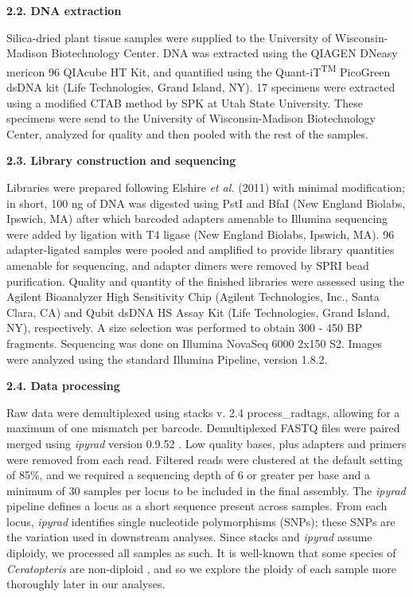 \documentclass[12pt]{article}
\begin{document}
\begin{flushleft}
\textbf{2.2. DNA extraction}

Silica-dried plant tissue samples were supplied to the University of Wisconsin-Madison Biotechnology Center. DNA was extracted using the QIAGEN DNeasy mericon 96 QIAcube HT Kit, and quantified using the Quant-iT\textsuperscript{TM} PicoGreen\textsuperscript{\textregistered} dsDNA kit (Life Technologies, Grand Island, NY). 17 specimens were extracted using a modified CTAB method \autocite{Doyle1987} by SPK at Utah State University. These specimens were send to the University of Wisconsin-Madison Biotechnology Center, analyzed for quality and then pooled with the rest of the samples.

\textbf{2.3. Library construction and sequencing}

Libraries were prepared following Elshire \textit{et al.} (2011)\nocite{Elshire2011} with minimal modification; in short, 100 ng of DNA was digested using PstI and BfaI (New England Biolabs, Ipswich, MA) after which barcoded adapters amenable to Illumina sequencing were added by ligation with T4 ligase (New England Biolabs, Ipswich, MA). 96 adapter-ligated samples were pooled and amplified to provide library quantities amenable for sequencing, and adapter dimers were removed by SPRI bead purification. Quality and quantity of the finished libraries were assessed using the Agilent Bioanalyzer High Sensitivity Chip (Agilent Technologies, Inc., Santa Clara, CA) and Qubit\textsuperscript{\textregistered} dsDNA HS Assay Kit (Life Technologies, Grand Island, NY), respectively. A size selection was performed to obtain 300 - 450 BP fragments. Sequencing was done on Illumina NovaSeq 6000 2x150 S2. Images were analyzed using the standard Illumina Pipeline, version 1.8.2. 

\textbf{2.4. Data processing}

Raw data were demultiplexed using stacks v. 2.4 \autocite{Catchen2011, Catchen2013} process\_radtags, allowing for a maximum of one mismatch per barcode. Demultiplexed FASTQ files were paired merged using \textit{ipyrad} version 0.9.52 \autocite{Eaton2020}. Low quality bases, plus adapters and primers were removed from each read. Filtered reads were clustered at the default setting of 85\%, and we required a sequencing depth of 6 or greater per base and a minimum of 30 samples per locus to be included in the final assembly. The \textit{ipyrad} pipeline defines a locus as a short sequence present across samples. From each locus, \textit{ipyrad} identifies single nucleotide polymorphisms (SNPs); these SNPs are the variation used in downstream analyses. Since stacks and \textit{ipyrad} assume diploidy, we processed all samples as such. It is well-known that some species of \textit{Ceratopteris} are non-diploid \autocite{Adjie2007, Masuyama2010}, and so we explore the ploidy of each sample more thoroughly later in our analyses.


\end{flushleft}
\end{document}
